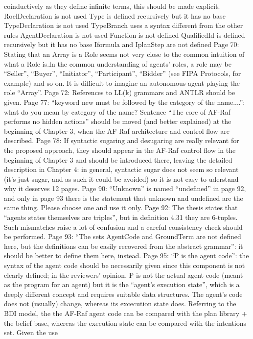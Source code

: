 \documentclass{article}
\begin{document}
coinductively as they define infinite terms, this should be made explicit.
RoelDeclaration is not used
Type is defined recursively but it has no base
TypeDeclaration is not used
TypeBranch uses a syntax different from the other rules
AgentDeclaration is not used
Function is not defined
QualifiedId is defined recursively but it has no base
Iformula and IplanStep are not defined
Page 70:
Stating that an Array is a Role seems not very close to the common intuition of what a Role is.In the
common understanding of agents' roles, a role may be “Seller”, “Buyer”, “Initiator”, “Participant”,
“Bidder” (see FIPA Protocols, for example) and so on. It is difficult to imagine an autonomous agent
playing the role “Array”.
Page 72:
References to LL(k) grammars and ANTLR should be given.
Page 77:
“keyword new must be followed by the category of the name....”: what do you mean by category of
the name?
Sentence “The core of AF-Raf performs no hidden actions” should be moved (and better explained)
at the beginning of Chapter 3, when the AF-Raf architecture and control flow are described.
Page 78:
If syntactic sugaring and desugaring are really relevant for the proposed approach, they should
appear in the AF-Raf control flow in the beginning of Chapter 3 and should be introduced there,
leaving the detailed description in Chapter 4: in general, syntactic sugar does not seem so relevant
(it's just sugar, and as such it could be avoided) so it is not easy to uderstand why it deserves 12
pages.
Page 90:
“Unknown” is named “undefined” in page 92, and only in page 93 there is the statement that
unknown and undefined are the same thing. Please choose one and use it only.
Page 92:
The thesis states that “agents states themselves are triples”, but in definition 4.31 they are 6-tuples.
Such mismatches raise a lot of confusion and a careful consistency check should be performed.
Page 93:
“The sets AgentCode and GroundTerm are not defined here, but the definitions can be easily
recovered from the abstract grammar”: it should be better to define them here, instead.
Page 95:
“P is the agent code”: the syntax of the agent code should be necessarily given since this component
is not clearly defined; in the reviewers' opinion, P is not the actual agent code (meant as the program
for an agent) but it is the “agent's execution state”, which is a deeply different concept and requires
suitable data structures. The agent's code does not (usually) change, whereas its excecution state
does. Referring to the BDI model, the the AF-Raf agent code can be compared with the plan library +
the belief base, whereas the execution state can be compared with the intentions set. Given the use
\end{document}
